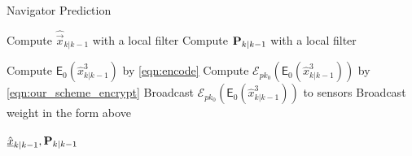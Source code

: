 \documentclass[10pt,letterpaper,oneside,twocolumn,journal]{IEEEtran}
\theoremstyle{definition}
\theoremstyle{definition}
\theoremstyle{remark}
\begin{document}
\begin{algorithm}[htbp]
\caption{Navigator Prediction}\label{alg:nav_prediction}
\begin{algorithmic}[1]
    \State Compute $\hat{\vec{x}}_{k|k-1}$ with a local filter
    \State Compute ${{\mathbf{P}}}_{k|k-1}$ with a local filter

    \State Compute $\mathsf{E}_{0}(\hat{x}^3_{k|k-1})$ by \eqref{eqn:encode}
    \State Compute $\mathcal{E}_{pk_0}(\mathsf{E}_{0}(\hat{x}^3_{k|k-1}))$ by \eqref{eqn:our_scheme_encrypt}
    \State Broadcast $\mathcal{E}_{pk_0}(\mathsf{E}_{0}(\hat{x}^3_{k|k-1}))$ to sensors
        \State Broadcast weight in the form above
    \EndFor

    \State \Return $\hat{{\underline{x}}}_{k|k-1}, {{\mathbf{P}}}_{k|k-1}$
    \EndProcedure
\end{algorithmic}
\end{algorithm}
\end{document}
